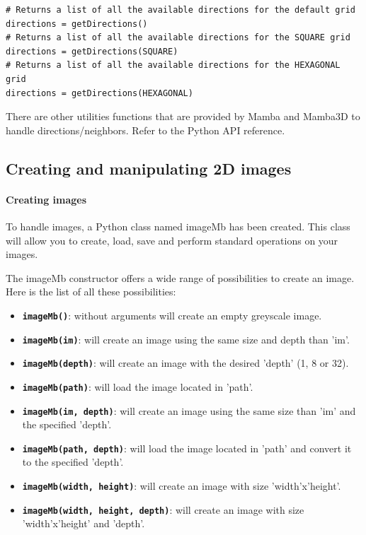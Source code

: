 \documentclass[a4paper,10pt,oneside]{article}
\begin{document}
\lstset{language=Python}
\begin{lstlisting}
# Returns a list of all the available directions for the default grid
directions = getDirections()
# Returns a list of all the available directions for the SQUARE grid
directions = getDirections(SQUARE)
# Returns a list of all the available directions for the HEXAGONAL grid
directions = getDirections(HEXAGONAL)
\end{lstlisting}

There are other utilities functions that are provided by Mamba and Mamba3D to
handle  directions/neighbors. Refer to the Python API reference.

\subsection{Creating and manipulating 2D images}
\label{cha:create_im}

\paragraph{Creating images}

To handle images, a Python class named imageMb has been created. This class will allow
you to create, load, save and perform standard operations on your images.

The imageMb constructor offers a wide range of possibilities to create an image. 
Here is the list of all these possibilities:

\begin{itemize}
\item \texttt{\textbf{imageMb()}}: without arguments will create an empty 
greyscale image.
\item \texttt{\textbf{imageMb(im)}}: will create an image using the same size 
and depth than 'im'.
\item \texttt{\textbf{imageMb(depth)}}: will create an image with the desired
'depth' (1, 8 or 32).
\item \texttt{\textbf{imageMb(path)}}: will load the image located in 'path'.
\item \texttt{\textbf{imageMb(im, depth)}}: will create an image using the same 
size than 'im' and the specified 'depth'.
\item \texttt{\textbf{imageMb(path, depth)}}: will load the image located in 
'path' and convert it to the specified 'depth'.
\item \texttt{\textbf{imageMb(width, height)}}: will create an image with size 
'width'x'height'.
\item \texttt{\textbf{imageMb(width, height, depth)}}: will create an image with
size 'width'x'height' and 'depth'.
\end{itemize}
\end{document}
